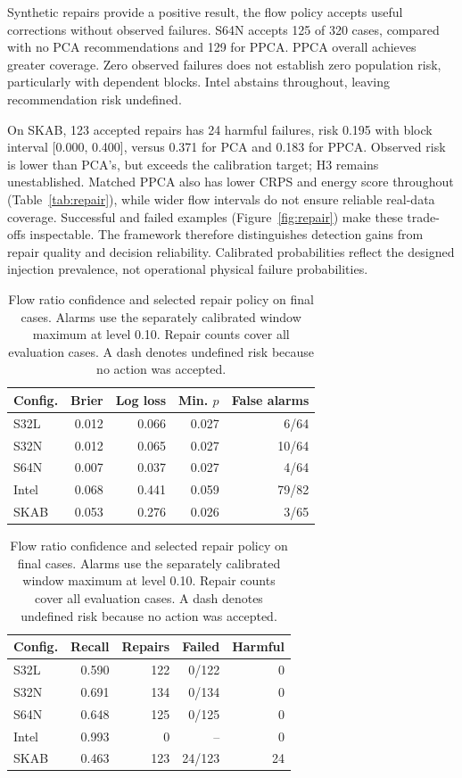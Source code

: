 \documentclass{llncs}
\newcommand{\1}{\mathbf{1}}
\begin{document}
Synthetic repairs provide a positive result, the flow policy accepts useful corrections without observed failures. S64N accepts 125 of 320 cases, compared with no PCA recommendations and 129 for PPCA. PPCA overall achieves greater coverage. Zero observed failures does not establish zero population risk, particularly with dependent blocks. Intel abstains throughout, leaving recommendation risk undefined.

On SKAB, 123 accepted repairs has 24 harmful failures, risk 0.195 with block interval [0.000, 0.400], versus 0.371 for PCA and 0.183 for PPCA. Observed risk is lower than PCA's, but exceeds the calibration target; H3 remains unestablished. Matched PPCA also has lower CRPS and energy score throughout (Table~\ref{tab:repair}), while wider flow intervals do not ensure reliable real-data coverage. Successful and failed examples (Figure~\ref{fig:repair}) make these trade-offs inspectable. The framework therefore distinguishes detection gains from repair quality and decision reliability. Calibrated probabilities reflect the designed injection prevalence, not operational physical failure probabilities.

\begin{table}[!tbp]
\centering
\caption{Flow ratio confidence and selected repair policy on final cases. Alarms use the separately calibrated window maximum at level 0.10. Repair counts cover all evaluation cases. A dash denotes undefined risk because no action was accepted.}
\label{tab:confidence}
\small
\begin{tabular}{lrrrr}\toprule
Config. & Brier & Log loss & Min. $p$ & False alarms \\\midrule
S32L & 0.012 & 0.066 & 0.027 & 6/64 \\
S32N & 0.012 & 0.065 & 0.027 & 10/64 \\
S64N & 0.007 & 0.037 & 0.027 & 4/64 \\
Intel & 0.068 & 0.441 & 0.059 & 79/82 \\
SKAB & 0.053 & 0.276 & 0.026 & 3/65 \\
\bottomrule
\end{tabular}
\par\medskip
\begin{tabular}{lrrrr}\toprule
Config. & Recall & Repairs & Failed & Harmful \\\midrule
S32L & 0.590 & 122 & 0/122 & 0 \\
S32N & 0.691 & 134 & 0/134 & 0 \\
S64N & 0.648 & 125 & 0/125 & 0 \\
Intel & 0.993 & 0 & -- & 0 \\
SKAB & 0.463 & 123 & 24/123 & 24 \\
\bottomrule
\end{tabular}
\end{table}
\end{document}
